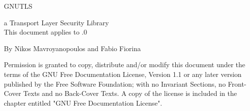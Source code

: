 \thispagestyle{empty}

\setlength{\parindent}{0mm}

\setlength{\parskip}{0mm}

 {\Huge GNUTLS\\[.1mm]}
 \HRule
 \begin{flushright}
  a Transport Layer Security Library\\[1mm]
  This document applies to .0
 \end{flushright}


 {\Large By Nikos Mavroyanopoulos and Fabio Fiorina\\[.1mm]}
 \HRule
 
\newpage


\begin{center}
\par
Permission is granted to copy, distribute and/or modify this
document under the terms of the GNU Free Documentation License,
Version 1.1 or any later version published by the Free Software
Foundation; with no Invariant Sections, no Front-Cover Texts and
no Back-Cover Texts.  A copy of the license is included in the
chapter entitled "GNU Free Documentation License".
\end{center}

\setlength{\parindent}{2mm}

\setlength{\parskip}{1mm}
